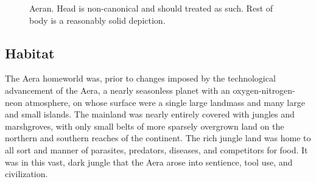 \begin{figure}
\begin{center}
    \caption{Aeran. Head is non-canonical and should treated as such. Rest of body is a reasonably solid depiction.}
    \label{fig:Aera-body}
\end{center}
\end{figure}


\subsection{Habitat}
The Aera homeworld was, prior to changes imposed by the technological
advancement of the Aera, a nearly seasonless planet with an
oxygen-nitrogen-neon atmosphere, on whose surface were a single large
landmass and many large and small islands. The mainland was nearly
entirely covered with jungles and marshgroves, with only small belts
of more sparsely overgrown land on the northern and southern reaches
of the continent. The rich jungle land was home to all sort and manner
of parasites, predators, diseases, and competitors for food. It was in
this vast, dark jungle that the Aera arose into sentience, tool use,
and civilization.

